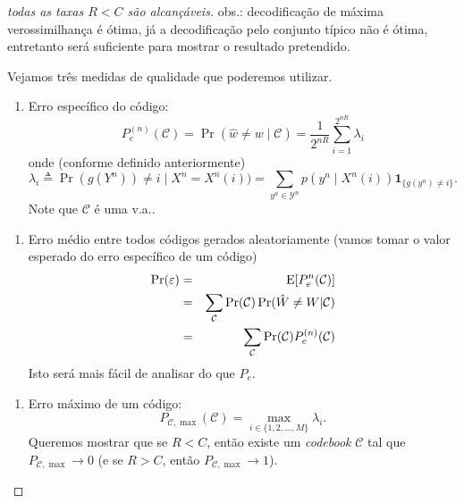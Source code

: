 \begin{frame}[allowframebreaks]
\begin{proof}[todas as taxas $R < C$ são alcançáveis]
  \proofbreak
  obs.: decodificação de máxima verossimilhança é ótima, já a decodificação pelo conjunto típico não é ótima,
	entretanto será suficiente para mostrar o resultado pretendido. 

  \proofbreak
  
  Vejamos três medidas de qualidade que poderemos utilizar.
  \begin{enumerate}
  \item Erro específico do código:
	\begin{equation}
	P_e^{(n)} (\mathcal{C}) = \Pr(\hat{w} \neq w \mid \mathcal{C}) = \frac{1}{2^{nR}} \sum_{i=1}^{2^{nR}} \lambda_i
	\end{equation}
	onde (conforme definido anteriormente)
	\begin{equation}
	\lambda_i \triangleq \Pr(g(Y^n)) \neq i \mid X^n = X^n(i)) = \sum_{y^n \in \mathcal{Y}^n} p(y^n \mid X^n(i)) \mathbf{1}_{\{ g(y^n) \neq i \}} .
	\end{equation}
	Note que $\mathcal{C}$ é uma v.a..
  \asuivre
  \end{enumerate}
 
  \proofbreak
  
  \begin{enumerate}
  \suite
  \item Erro médio entre todos códigos gerados aleatoriamente 
	(vamos tomar o valor esperado do erro específico de um código)
	\begin{eqnarray}
	\Pr(\varepsilon) &=& \mathrm{E}[P_e^n(\mathcal{C})] \nonumber \\
		&=& \sum_{\mathcal{C}} \Pr(\mathcal{C}) \Pr(\hat{W} \neq W | \mathcal{C}) \nonumber \\
		&=& \sum_{\mathcal{C}} \Pr(\mathcal{C}) P_e^{(n)}(\mathcal{C})
	\end{eqnarray}
	Isto será mais fácil de analisar do que $P_e$.
  \asuivre
  \end{enumerate}

  \proofbreak

  \begin{enumerate}
  \suite
  \item Erro máximo de um código:
	\begin{equation}
	P_{\mathcal{C}, \max} (\mathcal{C}) = \max_{i \in \{1,2, \ldots, M\}} \lambda_i .
	\end{equation}
	Queremos mostrar que se $R<C$, então existe um \textit{codebook} $\mathcal{C}$ tal que
	$P_{\mathcal{C}, \max} \rightarrow 0$ (e se $R > C$, então $P_{\mathcal{C}, \max} \rightarrow 1$).
  \end{enumerate}


\end{proof}
\end{frame}

